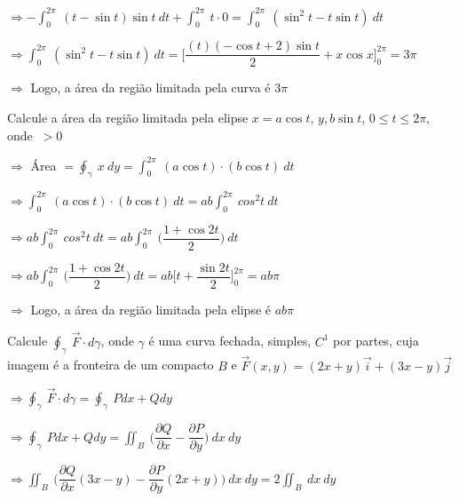 \documentclass[11pt,a4paper]{article}
\begin{document}
\begin{enumerate}
{{		$\Rightarrow - \displaystyle\int_{0}^{2\pi}\ (t - \sin t)\sin t\ dt + \displaystyle\int_{0}^{2\pi}\ t \cdot 0 = \displaystyle\int_{0}^{2\pi}\ (\sin^2 t - t\sin t)\ dt$
		
		$\Rightarrow \displaystyle\int_{0}^{2\pi}\ (\sin^2 t - t\sin t)\ dt = \Bigg[\dfrac{(t)(- \cos t + 2 )\sin t  }{2} + x\cos x \Bigg]_0^{2\pi} = 3\pi$
		
		$\Rightarrow$ Logo, a área da região limitada pela curva é $3\pi$ 
		
		\item Calcule a área da região limitada pela elipse $x = a \cos t$, $y, b \sin t$, $0 \leq t \leq 2\pi$, onde $\ > 0$
		
		$\Rightarrow$ Área $= \oint_\gamma\ x\ dy = \displaystyle\int_{0}^{2\pi}\ (a\cos t)\cdot(b\cos t)\ dt $
		
		$\Rightarrow \displaystyle\int_{0}^{2\pi}\ (a\cos t)\cdot(b\cos t)\ dt = ab\displaystyle\int_{0}^{2\pi}\ cos^2t\ dt$
		
		$\Rightarrow ab\displaystyle\int_{0}^{2\pi}\ cos^2t\ dt = ab\displaystyle\int_{0}^{2\pi}\ \Bigg(\dfrac{1 + \cos 2t}{2}\Bigg)\ dt$
		
		$\Rightarrow ab\displaystyle\int_{0}^{2\pi}\ \Bigg(\dfrac{1 + \cos 2t}{2}\Bigg)\ dt = ab\Bigg[ t + \dfrac{\sin 2t}{2}\Bigg]_0^{2\pi} = ab\pi$
		
		$\Rightarrow$ Logo, a área da região limitada pela elipse é $ab\pi$
		
		\item Calcule $\oint_\gamma\ \vec{F} \cdot d\gamma$, onde $\gamma$ é uma curva fechada, simples, $C^1$ por partes, cuja imagem é a fronteira de um compacto $B$ e $\vec{F}(x,y) = (2x + y)\vec{i} + (3x - y)\vec{j}$ 
		
		$\Rightarrow \displaystyle\oint_\gamma\ \vec{F} \cdot d\gamma = \displaystyle\oint_\gamma\ Pdx + Qdy$
		
		$\Rightarrow \displaystyle\oint_\gamma\ Pdx + Qdy = \displaystyle\iint_B\ \Bigg(\dfrac{\partial Q}{\partial x} - \dfrac{\partial P}{\partial y}\Bigg)\ dx\ dy$
		
		$\Rightarrow \displaystyle\iint_B\ \Bigg(\dfrac{\partial Q}{\partial x}(3x - y) - \dfrac{\partial P}{\partial y}(2x + y)\Bigg)\ dx\ dy = 2\displaystyle\iint_B\ dx\ dy $
		
}}
\end{enumerate}
\end{document}

